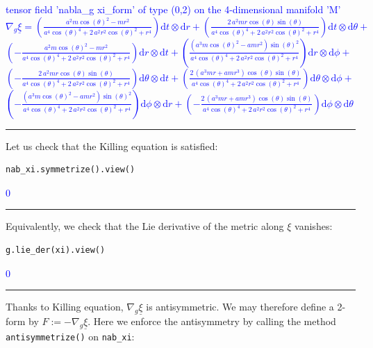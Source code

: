 \documentclass[a4paper]{jpconf}
\newcommand{\code}[1]{\texttt{#1}}
\newcommand{\soutput}[1]{\textcolor{blue}{#1}\\[-0.8ex]\rule{\textwidth}{0.4pt}}
\begin{document}
\soutput{tensor field 'nabla\_g xi\_form' of type (0,2) on the 4-dimensional
manifold 'M'\\[1ex]
$\nabla_{g} \underline{\xi} = \left( \frac{a^{2} m
\cos\left(\theta\right)^{2} - m r^{2}}{a^{4} \cos\left(\theta\right)^{4}
+ 2 \, a^{2} r^{2} \cos\left(\theta\right)^{2} + r^{4}} \right)
\mathrm{d} t\otimes \mathrm{d} r + \left( \frac{2 \, a^{2} m r
\cos\left(\theta\right) \sin\left(\theta\right)}{a^{4}
\cos\left(\theta\right)^{4} + 2 \, a^{2} r^{2}
\cos\left(\theta\right)^{2} + r^{4}} \right) \mathrm{d} t\otimes
\mathrm{d} \theta + $\\
$\left( -\frac{a^{2} m \cos\left(\theta\right)^{2} -
m r^{2}}{a^{4} \cos\left(\theta\right)^{4} + 2 \, a^{2} r^{2}
\cos\left(\theta\right)^{2} + r^{4}} \right) \mathrm{d} r\otimes
\mathrm{d} t + \left( \frac{{\left(a^{3} m \cos\left(\theta\right)^{2} -
a m r^{2}\right)} \sin\left(\theta\right)^{2}}{a^{4}
\cos\left(\theta\right)^{4} + 2 \, a^{2} r^{2}
\cos\left(\theta\right)^{2} + r^{4}} \right) \mathrm{d} r\otimes
\mathrm{d} \phi + $\\
$\left( -\frac{2 \, a^{2} m r \cos\left(\theta\right)
\sin\left(\theta\right)}{a^{4} \cos\left(\theta\right)^{4} + 2 \, a^{2}
r^{2} \cos\left(\theta\right)^{2} + r^{4}} \right) \mathrm{d}
\theta\otimes \mathrm{d} t + \left( \frac{2 \, {\left(a^{3} m r + a m
r^{3}\right)} \cos\left(\theta\right) \sin\left(\theta\right)}{a^{4}
\cos\left(\theta\right)^{4} + 2 \, a^{2} r^{2}
\cos\left(\theta\right)^{2} + r^{4}} \right) \mathrm{d} \theta\otimes
\mathrm{d} \phi + $ \\
$\left( -\frac{{\left(a^{3} m
\cos\left(\theta\right)^{2} - a m r^{2}\right)}
\sin\left(\theta\right)^{2}}{a^{4} \cos\left(\theta\right)^{4} + 2 \,
a^{2} r^{2} \cos\left(\theta\right)^{2} + r^{4}} \right) \mathrm{d}
\phi\otimes \mathrm{d} r + \left( -\frac{2 \, {\left(a^{3} m r + a m
r^{3}\right)} \cos\left(\theta\right) \sin\left(\theta\right)}{a^{4}
\cos\left(\theta\right)^{4} + 2 \, a^{2} r^{2}
\cos\left(\theta\right)^{2} + r^{4}} \right) \mathrm{d} \phi\otimes
\mathrm{d} \theta$}
Let us check that the Killing equation is satisfied:
\begin{verbatim}
nab_xi.symmetrize().view()
\end{verbatim}
\soutput{$0$}
Equivalently, we check that the Lie derivative of the metric along $\xi$
vanishes:
\begin{verbatim}
g.lie_der(xi).view()
\end{verbatim}
\soutput{$0$}
Thanks to Killing equation, $\nabla_g \underline{\xi}$ is antisymmetric. We may therefore define a 2-form by $F:= - \nabla_g \underline{\xi}$. Here we enforce the antisymmetry by calling the method \code{antisymmetrize()} on \code{nab\_xi}:
\end{document}
